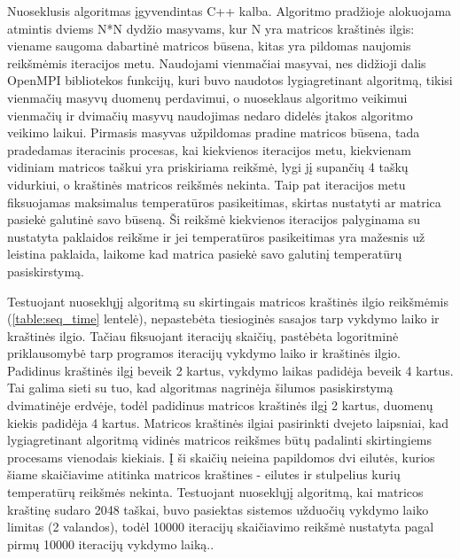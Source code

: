 \documentclass{VUMIFPSbakalaurinis}
\begin{document}
Nuoseklusis algoritmas įgyvendintas C++ kalba. 
Algoritmo pradžioje alokuojama atmintis dviems N*N dydžio masyvams, kur N yra matricos kraštinės ilgis: viename saugoma dabartinė matricos būsena, kitas yra pildomas naujomis reikšmėmis iteracijos metu.
Naudojami vienmačiai masyvai, nes didžioji dalis OpenMPI bibliotekos funkcijų, kuri buvo naudotos lygiagretinant algoritmą, tikisi vienmačių masyvų duomenų perdavimui, o nuoseklaus algoritmo veikimui vienmačių ir dvimačių masyvų naudojimas nedaro didelės įtakos algoritmo veikimo laikui.
Pirmasis masyvas užpildomas pradine matricos būsena, tada pradedamas iteracinis procesas, kai kiekvienos iteracijos metu, kiekvienam vidiniam matricos taškui yra priskiriama reikšmė, lygi jį supančių 4 taškų vidurkiui, o kraštinės matricos reikšmės nekinta.
Taip pat iteracijos metu fiksuojamas maksimalus temperatūros pasikeitimas, skirtas nustatyti ar matrica pasiekė galutinė savo būseną.
Ši reikšmė kiekvienos iteracijos palyginama su nustatyta paklaidos reikšme ir jei temperatūros pasikeitimas yra mažesnis už leistina paklaida, laikome kad matrica pasiekė savo galutinį temperatūrų pasiskirstymą.

Testuojant nuoseklųjį algoritmą su skirtingais matricos kraštinės ilgio reikšmėmis (\ref{table:seq_time} lentelė), nepastebėta tiesioginės sasajos tarp vykdymo laiko ir kraštinės ilgio.
Tačiau fiksuojant iteracijų skaičių, pastėbėta logoritminė priklausomybė tarp programos iteracijų vykdymo laiko ir kraštinės ilgio.
Padidinus kraštinės ilgį beveik 2 kartus, vykdymo laikas padidėja beveik 4 kartus.
Tai galima sieti su tuo, kad algoritmas nagrinėja šilumos pasiskirstymą dvimatinėje erdvėje, todėl padidinus matricos kraštinės ilgį 2 kartus, duomenų kiekis padidėja 4 kartus.
Matricos kraštinės ilgiai pasirinkti dvejeto laipsniai, kad lygiagretinant algoritmą vidinės matricos reikšmes būtų padalinti skirtingiems procesams vienodais kiekiais. 
Į ši skaičių neieina papildomos dvi eilutės, kurios šiame skaičiavime atitinka matricos kraštines - eilutes ir stulpelius kurių temperatūrų reikšmės nekinta.
Testuojant nuoseklųjį algoritmą, kai matricos kraštinę sudaro 2048 taškai, buvo pasiektas sistemos užduočių vykdymo laiko limitas (2 valandos), todėl 10000 iteracijų skaičiavimo reikšmė nustatyta pagal pirmų 10000 iteracijų vykdymo laiką..
\end{document}
